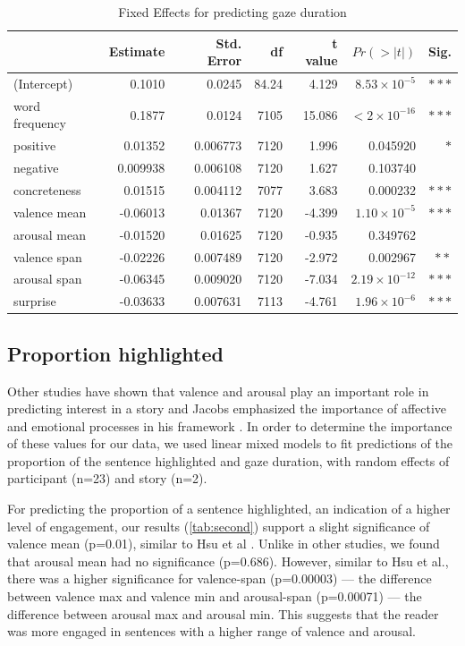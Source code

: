 \documentclass[11pt]{article}
\begin{document}
\begin{table}[h]
  \centering
  \begin{tabular}{|l|r|r|r|r|r|r|}
  \hline
  & Estimate & Std. Error & df & t value & $Pr(>|t|)$ & Sig. \\
  \hline
  (Intercept) & 0.1010 & 0.0245 & 84.24 & 4.129 & $8.53 \times 10^{-5}$ & $\ast\ast\ast$ \\
  word frequency & 0.1877 & 0.0124 & 7105 & 15.086 & $< 2 \times 10^{-16}$ & $\ast\ast\ast$ \\
  positive & 0.01352 & 0.006773 & 7120 & 1.996 & 0.045920 & $\ast$ \\
  negative & 0.009938 & 0.006108 & 7120 & 1.627 & 0.103740 & \\
  concreteness & 0.01515 & 0.004112 & 7077 & 3.683 & 0.000232 & $\ast\ast\ast$ \\
  valence mean & -0.06013 & 0.01367 & 7120 & -4.399 & $1.10 \times 10^{-5}$ & $\ast\ast\ast$ \\
  arousal mean & -0.01520 & 0.01625 & 7120 & -0.935 & 0.349762 & \\
  valence span & -0.02226 & 0.007489 & 7120 & -2.972 & 0.002967 & $\ast\ast$ \\
  arousal span & -0.06345 & 0.009020 & 7120 & -7.034 & $2.19 \times 10^{-12}$ & $\ast\ast\ast$ \\
  surprise & -0.03633 & 0.007631 & 7113 & -4.761 & $1.96 \times 10^{-6}$ & $\ast\ast\ast$ \\
  \hline
  \end{tabular}
  \caption{Fixed Effects for predicting gaze duration}
  \label{tab:third}
  \end{table}

\subsection{Proportion highlighted}
Other studies have shown that valence and arousal play an important role in predicting interest in a story \citep{Maslej2019TheTF, HSU201596} and Jacobs emphasized the importance of affective and emotional processes in his framework \citep{willems_2015}. In order to determine the importance of these values for our data, we used linear mixed models to fit predictions of the proportion of the sentence highlighted and gaze duration, with random effects of participant (n=23) and story (n=2).

For predicting the proportion of a sentence highlighted, an indication of a higher level of engagement, our results (\autoref{tab:second}) support a slight significance of valence mean (p=0.01), similar to Hsu et al \citep{HSU201596}. Unlike in other studies, we found that arousal mean had no significance (p=0.686).  However, similar to Hsu et al., there was a higher significance for valence-span (p=0.00003) --- the difference between valence max and valence min and arousal-span (p=0.00071) --- the difference between arousal max and arousal min. This suggests that the reader was more engaged in sentences with a higher range of valence and arousal.
\end{document}
